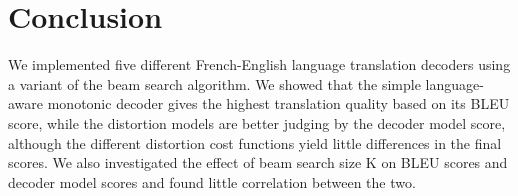 \documentclass[12pt]{article}   %
\begin{document}

\section{Conclusion}
We implemented five different French-English language translation decoders using a variant of the beam search algorithm. We showed that the simple language-aware monotonic decoder gives the highest translation quality based on its BLEU score, while the distortion models are better judging by the decoder model score, although the different distortion cost functions yield little differences in the final scores. We also investigated the effect of beam search size K on BLEU scores and decoder model scores and found little correlation between the two.




\end{document}
